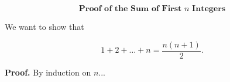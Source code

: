 $$
\textbf{Proof of the Sum of First $n$ Integers}
$$

We want to show that

\[
1 + 2 + \dots + n = \frac{n(n+1)}{2}.
\]

\textbf{Proof.}
By induction on $n$...

